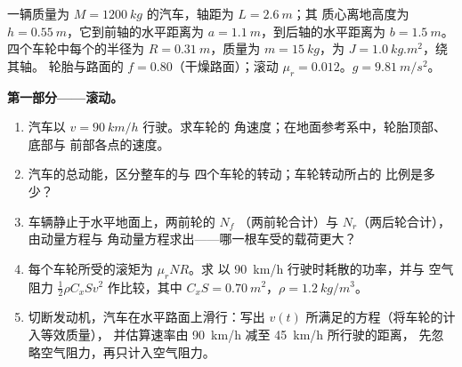\begin{problem}
\label{pb:b2:rigid-body-mechanics:1}

一辆质量为 $M = \qty{1200}{kg}$ 的汽车，轴距为 $L = \qty{2.6}{m}$；其
质心离地高度为 $h = \qty{0.55}{m}$，它到前轴的水平距离为
$a = \qty{1.1}{m}$，到后轴的水平距离为 $b = \qty{1.5}{m}$。
四个车轮中每个的半径为 $R = \qty{0.31}{m}$，质量为 $m =
\qty{15}{kg}$，为 $J = \qty{1.0}{kg.m^2}$，绕其轴。
轮胎与路面的 $f = 0.80$（干燥路面）；滚动 $\mu_r = 0.012$。$g = \qty{9.81}{m/s^2}$。

\medskip
\noindent\textbf{第一部分——滚动。}
\begin{enumerate}
  \item 汽车以 $v = \qty{90}{km/h}$ 行驶。求车轮的
        角速度；在地面参考系中，轮胎顶部、底部与
        前部各点的速度。
  \item 汽车的总动能，区分整车的与
        四个车轮的转动；车轮转动所占的
        比例是多少？
  \item 车辆静止于水平地面上，两前轮的 $N_f$
        （两前轮合计）与 $N_r$（两后轮合计），由动量方程与
        角动量方程求出——哪一根车受的载荷更大？
  \item 每个车轮所受的滚矩为 $\mu_rNR$。求
        以 \qty{90}{km/h} 行驶时耗散的功率，并与
        空气阻力 $\tfrac12\rho C_xSv^2$ 作比较，其中 $C_xS =
        \qty{0.70}{m^2}$，$\rho = \qty{1.2}{kg/m^3}$。
  \item 切断发动机，汽车在水平路面上滑行：写出
        $v(t)$ 所满足的方程（将车轮的计入等效质量），
        并估算速率由 \qty{90}{km/h} 减至 \qty{45}{km/h} 所行驶的距离，
        先忽略空气阻力，再只计入空气阻力。
\end{enumerate}


\end{problem}
